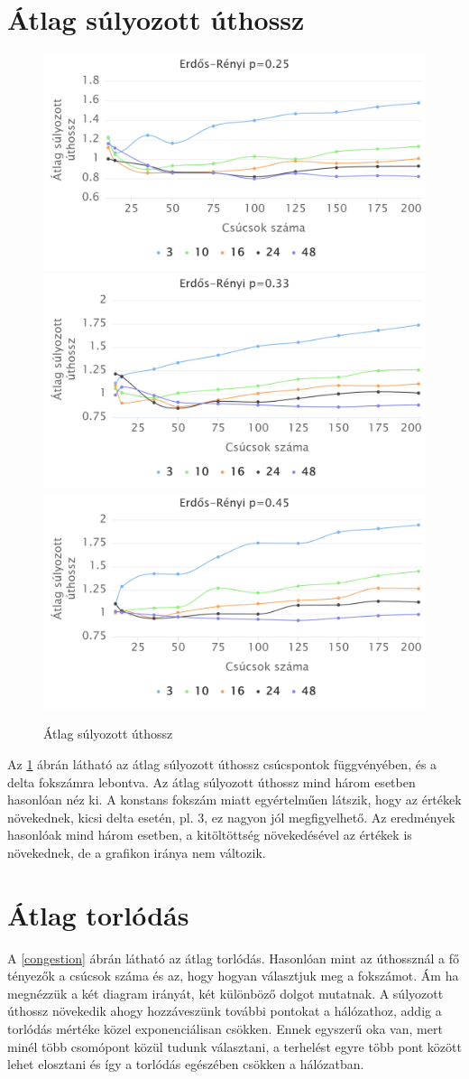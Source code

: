 \documentclass[12pt]{report}
\begin{document}
\section{Átlag súlyozott úthossz}

\begin{figure}[h]
	\begin{center}
		\includegraphics[width=0.40\linewidth]{pictures/constant_dan_ratio25_avg_route_len.png}
		\includegraphics[width=0.40\linewidth]{pictures/constant_dan_ratio33_avg_route_len.png}
		\includegraphics[width=0.40\linewidth]{pictures/constant_dan_ratio45_avg_route_len.png}
		\caption{Átlag súlyozott úthossz}
		\label{avg-len}
	\end{center}
\end{figure}


Az \ref{avg-len} ábrán látható az átlag súlyozott úthossz csúcspontok függvényében, és a delta fokszámra lebontva.
Az átlag súlyozott úthossz mind három esetben hasonlóan néz ki.
A konstans fokszám miatt egyértelműen látszik, hogy az értékek növekednek, kicsi delta esetén, pl. 3, ez nagyon jól megfigyelhető.
Az eredmények hasonlóak mind három esetben, a kitöltöttség növekedésével az értékek is növekednek, de a grafikon iránya nem változik.

\section{Átlag torlódás}

A \ref{congestion} ábrán látható az átlag torlódás. 
Hasonlóan mint az úthossznál a fő tényezők a csúcsok száma és az, hogy hogyan választjuk meg a fokszámot.
Ám ha megnézzük a két diagram irányát, két különböző dolgot mutatnak. 
A súlyozott úthossz növekedik ahogy hozzáveszünk további pontokat a hálózathoz, addig a torlódás mértéke közel exponenciálisan csökken.
Ennek egyszerű oka van, mert minél több csomópont közül tudunk választani, a terhelést egyre több pont között lehet elosztani és így a torlódás egészében csökken a hálózatban.
\end{document}
